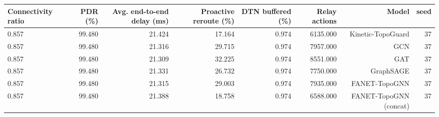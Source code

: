 \begin{tabular}{lrrrrrrr}
\toprule
Connectivity ratio & PDR (\%) & Avg. end-to-end delay (ms) & Proactive reroute (\%) & DTN buffered (\%) & Relay actions & Model & seed \\
\midrule
0.857 & 99.480 & 21.424 & 17.164 & 0.974 & 6135.000 & Kinetic-TopoGuard & 37 \\
0.857 & 99.480 & 21.316 & 29.715 & 0.974 & 7957.000 & GCN & 37 \\
0.857 & 99.480 & 21.309 & 32.225 & 0.974 & 8551.000 & GAT & 37 \\
0.857 & 99.480 & 21.331 & 26.732 & 0.974 & 7750.000 & GraphSAGE & 37 \\
0.857 & 99.480 & 21.315 & 29.003 & 0.974 & 7935.000 & FANET-TopoGNN & 37 \\
0.857 & 99.480 & 21.388 & 18.758 & 0.974 & 6588.000 & FANET-TopoGNN (concat) & 37 \\
\bottomrule
\end{tabular}